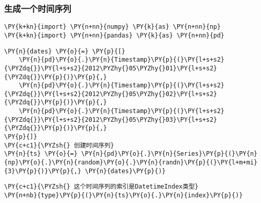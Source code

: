     \hypertarget{ux751fux6210ux4e00ux4e2aux65f6ux95f4ux5e8fux5217}{%
\subsubsection{生成一个时间序列}\label{ux751fux6210ux4e00ux4e2aux65f6ux95f4ux5e8fux5217}}

    \begin{tcolorbox}[breakable, size=fbox, boxrule=1pt, pad at break*=1mm,colback=cellbackground, colframe=cellborder]
\begin{Verbatim}[commandchars=\\\{\}]
\PY{k+kn}{import} \PY{n+nn}{numpy} \PY{k}{as} \PY{n+nn}{np}
\PY{k+kn}{import} \PY{n+nn}{pandas} \PY{k}{as} \PY{n+nn}{pd}
\end{Verbatim}
\end{tcolorbox}

    \begin{tcolorbox}[breakable, size=fbox, boxrule=1pt, pad at break*=1mm,colback=cellbackground, colframe=cellborder]
\begin{Verbatim}[commandchars=\\\{\}]
\PY{n}{dates} \PY{o}{=} \PY{p}{[}
    \PY{n}{pd}\PY{o}{.}\PY{n}{Timestamp}\PY{p}{(}\PY{l+s+s2}{\PYZdq{}}\PY{l+s+s2}{2012\PYZhy{}05\PYZhy{}01}\PY{l+s+s2}{\PYZdq{}}\PY{p}{)}\PY{p}{,}
    \PY{n}{pd}\PY{o}{.}\PY{n}{Timestamp}\PY{p}{(}\PY{l+s+s2}{\PYZdq{}}\PY{l+s+s2}{2012\PYZhy{}05\PYZhy{}02}\PY{l+s+s2}{\PYZdq{}}\PY{p}{)}\PY{p}{,}
    \PY{n}{pd}\PY{o}{.}\PY{n}{Timestamp}\PY{p}{(}\PY{l+s+s2}{\PYZdq{}}\PY{l+s+s2}{2012\PYZhy{}05\PYZhy{}03}\PY{l+s+s2}{\PYZdq{}}\PY{p}{)}\PY{p}{,}
\PY{p}{]}
\PY{c+c1}{\PYZsh{} 创建时间序列}
\PY{n}{ts} \PY{o}{=} \PY{n}{pd}\PY{o}{.}\PY{n}{Series}\PY{p}{(}\PY{n}{np}\PY{o}{.}\PY{n}{random}\PY{o}{.}\PY{n}{randn}\PY{p}{(}\PY{l+m+mi}{3}\PY{p}{)}\PY{p}{,} \PY{n}{dates}\PY{p}{)}
\end{Verbatim}
\end{tcolorbox}

    \begin{tcolorbox}[breakable, size=fbox, boxrule=1pt, pad at break*=1mm,colback=cellbackground, colframe=cellborder]
\begin{Verbatim}[commandchars=\\\{\}]
\PY{c+c1}{\PYZsh{} 这个时间序列的索引是DatetimeIndex类型}
\PY{n+nb}{type}\PY{p}{(}\PY{n}{ts}\PY{o}{.}\PY{n}{index}\PY{p}{)}
\end{Verbatim}
\end{tcolorbox}

